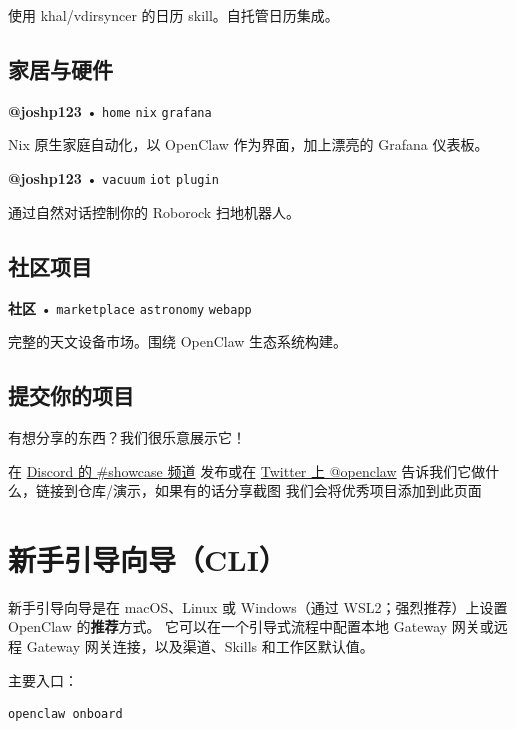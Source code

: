 使用 khal/vdirsyncer 的日历 skill。自托管日历集成。


\subsection{家居与硬件}



\textbf{@joshp123} • \texttt{home} \texttt{nix} \texttt{grafana}

Nix 原生家庭自动化，以 OpenClaw 作为界面，加上漂亮的 Grafana 仪表板。


\textbf{@joshp123} • \texttt{vacuum} \texttt{iot} \texttt{plugin}

通过自然对话控制你的 Roborock 扫地机器人。



\subsection{社区项目}



\textbf{社区} • \texttt{marketplace} \texttt{astronomy} \texttt{webapp}

完整的天文设备市场。围绕 OpenClaw 生态系统构建。


\hrulefill


\subsection{提交你的项目}


有想分享的东西？我们很乐意展示它！

在 \href{https://discord.gg/clawd}{Discord 的 \#showcase 频道} 发布或在 \href{https://x.com/openclaw}{Twitter 上 @openclaw}
告诉我们它做什么，链接到仓库/演示，如果有的话分享截图
我们会将优秀项目添加到此页面


\clearpage

\section{新手引导向导（CLI）}


新手引导向导是在 macOS、Linux 或 Windows（通过 WSL2；强烈推荐）上设置 OpenClaw 的\textbf{推荐}方式。
它可以在一个引导式流程中配置本地 Gateway 网关或远程 Gateway 网关连接，以及渠道、Skills 和工作区默认值。

主要入口：

\begin{lstlisting}[language=bash]
openclaw onboard
\end{lstlisting}


